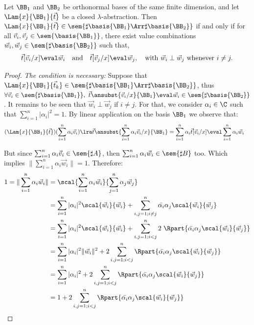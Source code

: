 \begin{restatelemma}
  Let $\BB_1$ and $\BB_2$ be orthonormal bases of the same finite
  dimension, and let $\Lam{x}{\BB_1}{\vec t}$ be a closed $\lambda$-abstraction.
  Then $\Lam{x}{{\BB_1}}{\vec t}\in\sem{\sharp\basis{\BB_1}\Arr\sharp\basis{\BB_2}}$
  if and only if 
  for all $\vec{v}_{i},\vec{v}_{j}\in\sem{\basis{\BB_1}}$,
  there exist value combinations
  $\vec{w}_{i},\vec{w}_{j}\in\sem{\sharp\basis{\BB_2}}$ such that,
  \[
    \vec{t}[\vec{v}_{i}/x]\eval\vec{w}_{i}
    \quad\text{and}\quad
    \vec{t}[\vec{v}_{j}/x]\eval\vec{w}_{j},
    \quad\text{with } 
    \vec{w}_{i}\perp\vec{w}_{j}\text{ whenever }i\neq j.
  \]
\end{restatelemma}
\begin{proof}
  \textit{The condition is necessary:} Suppose that $\Lam{x}{{\BB_1}}{\vec{t}_{k}}\in\sem{\sharp\basis{\BB_1}\Arr\sharp\basis{\BB_2}}$, thus $\forall \vec{v}_{i}\in\sem{\sharp\basis{\BB_1}},\ \vec{t}\ansubst{\vec{v}_{i}/x}{\BB_1}\eval\vec{w}_{i}\in\sem{\sharp\basis{\BB_2}}$. It remains to be seen that $\vec{w}_{i} \perp \vec{w}_{j}$ if $i\neq j$. For that, we consider $\alpha_i\in\C$ such that $\sum_{i=1}^n |\alpha_i|^2 = 1$. By linear application on the basis $\BB_1$ we observe that:
  \begin{align*}
    (\Lam{x}{{\BB_1}}{\vec{t}})(\sum_{i=1}^n \alpha_i \vec{v}_{i}) &\lra \vec t\ansubst{\sum_{i=1}^n \alpha_i \vec{v}_{i}/x}{\BB_1}
    = \sum_{i=1}^{n} \alpha_i \vec{t}[\vec{v}_{i}/x] 
    \eval \sum_{i=1}^n \alpha_i \vec{w}_{i}
  \end{align*}

  But since $\sum_{i=1}^n \alpha_i \vec{v}_{i}\in\sem{\sharp A}$, then $\sum_{i=1}^n \alpha_i \vec{w}_{i}\in\sem{\sharp B}$ too. Which implies $\|\sum_{i=1}^n \alpha_i \vec{w}_{i}\|=1$. Therefore:
  \begin{align*}
    1 = \|\sum_{i=1}^n \alpha_i \vec{w}_{i}\| &= \scal{\sum_{i=1}^n \alpha_i \vec{w}_{i}}{\sum_{j=1}^n \alpha_j \vec{w}_{j}}\\
    &=\sum_{i=1}^n |\alpha_i|^2 \scal{\vec{w}_{i}}{\vec{w}_{i} } + \sum_{i,j=1; i\neq j}^n \bar{\alpha_i}\alpha_j \scal{\vec{w}_{i}}{\vec{w}_{j}}\\
    &=\sum_{i=1}^n |\alpha_i|^2 \scal{\vec{w}_{i}}{\vec{w}_{i} } + \sum_{i,j=1; i<j}^n 2~\Rpart{\bar{\alpha_i}\alpha_j \scal{\vec{w}_{i}}{\vec{w}_{j}}}\\
    &=\sum_{i=1}^n |\alpha_i|^2 \|\vec{w}_{i}\|^2 + 2\sum_{i,j=1; i<j}^n \Rpart{\bar{\alpha_i}\alpha_j \scal{\vec{w}_{i}}{\vec{w}_{j}}}\\
    &=\sum_{i=1}^n |\alpha_i|^2 + 2\sum_{i,j=1; i<j}^n\Rpart{\bar{\alpha_i}\alpha_j \scal{\vec{w}_{i}}{\vec{w}_{j}}}\\
    &= 1 + 2\sum_{i,j=1; i<j}^n \Rpart{\bar{\alpha_i}\alpha_j \scal{\vec{w}_{i}}{\vec{w}_{j}}}
  \end{align*}


\end{proof}
